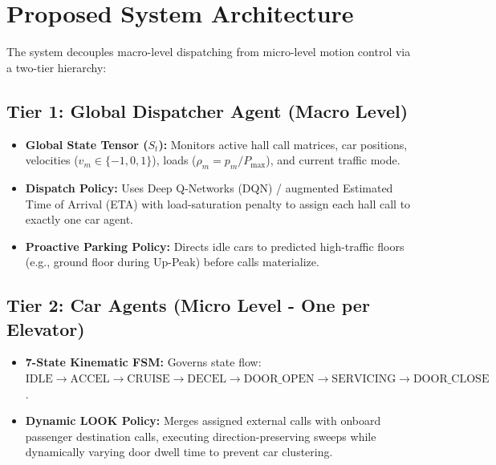 \documentclass[10pt,a4paper,twocolumn]{article}
\begin{document}
\section{Proposed System Architecture}
The system decouples macro-level dispatching from micro-level motion control via a two-tier hierarchy:

\subsection{Tier 1: Global Dispatcher Agent (Macro Level)}
\begin{itemize}
    \item \textbf{Global State Tensor ($S_t$):} Monitors active hall call matrices, car positions, velocities ($v_m \in \{-1, 0, 1\}$), loads ($\rho_m = p_m/P_{\max}$), and current traffic mode.
    \item \textbf{Dispatch Policy:} Uses Deep Q-Networks (DQN) / augmented Estimated Time of Arrival (ETA) with load-saturation penalty to assign each hall call to exactly one car agent.
    \item \textbf{Proactive Parking Policy:} Directs idle cars to predicted high-traffic floors (e.g., ground floor during Up-Peak) before calls materialize.
\end{itemize}

\subsection{Tier 2: Car Agents (Micro Level - One per Elevator)}
\begin{itemize}
    \item \textbf{7-State Kinematic FSM:} Governs state flow: $\text{IDLE} \rightarrow \text{ACCEL} \rightarrow \text{CRUISE} \rightarrow \text{DECEL} \rightarrow \text{DOOR\_OPEN} \rightarrow \text{SERVICING} \rightarrow \text{DOOR\_CLOSE}$.
    \item \textbf{Dynamic LOOK Policy:} Merges assigned external calls with onboard passenger destination calls, executing direction-preserving sweeps while dynamically varying door dwell time to prevent car clustering.
\end{itemize}
\end{document}
